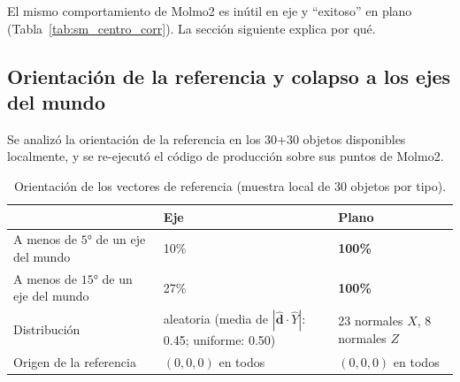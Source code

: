 \begin{table}[htbp]
\centering
\caption{Correlación entre el porcentaje de centrado y el desempeño (57 filas
prompt $\times$ $n_v$ por tipo).}
\label{tab:sm_centro_corr}
\end{table}

El mismo comportamiento de Molmo2 es inútil en eje y ``exitoso'' en plano
(Tabla~\ref{tab:sm_centro_corr}). La sección siguiente explica por qué.

\subsection{Orientación de la referencia y colapso a los ejes del mundo}
\label{sec:sm_orientacion}

Se analizó la orientación de la referencia en los 30+30 objetos disponibles
localmente, y se re-ejecutó el código de producción sobre sus puntos de Molmo2.

\begin{table}[htbp]
\centering
\caption{Orientación de los vectores de referencia (muestra local de 30 objetos por tipo).}
\label{tab:sm_gt_orient}
\begin{tabular}{p{5.2cm}p{5.4cm}p{3.4cm}}
\toprule
 & Eje & Plano \\
\midrule
A menos de $5°$ de un eje del mundo & 10\% & \textbf{100\%} \\
A menos de $15°$ de un eje del mundo & 27\% & \textbf{100\%} \\
Distribución & aleatoria (media de $|\hat{\mathbf{d}}\cdot\hat{Y}|$: 0.45; uniforme: 0.50) & 23 normales $X$, 8 normales $Z$ \\
Origen de la referencia & $(0,0,0)$ en todos & $(0,0,0)$ en todos \\
\bottomrule
\end{tabular}
\end{table}

